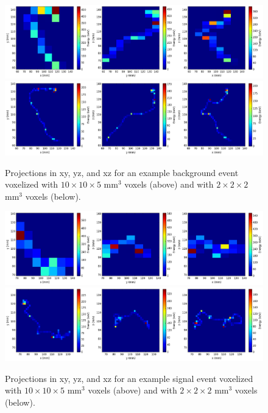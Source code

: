 \documentclass[a4paper,11pt]{article}
\begin{document}
\begin{figure}[!htb]
	\centering
	\includegraphics[scale=0.36]{fig/plt_h2D_dnn_NEXT100_Bi214_bg_v10x10x5_r200x200x200_6_bg.png}
	\includegraphics[scale=0.36]{fig/plt_h2D_dnn_NEXT100_Bi214_bg_v2x2x2_r200x200x200_2_bg.png}
	\caption{\label{fig.exampleProjs10105}Projections in xy, yz, and xz for an example background event voxelized with $10 \times 10 \times 5$ mm$^3$ voxels (above) and with $2 \times 2 \times 2$ mm$^3$ voxels (below).}
\end{figure}

\begin{figure}[!htb]
	\centering
	\includegraphics[scale=0.36]{fig/plt_h2D_dnn_NEXT100_0vbb_si_v10x10x5_r200x200x200_6_si.png}
	\includegraphics[scale=0.36]{fig/plt_h2D_dnn_NEXT100_0vbb_si_v2x2x2_r200x200x200_4_si.png}
	\caption{\label{fig.exampleProjs222}Projections in xy, yz, and xz for an example signal event voxelized with $10 \times 10 \times 5$ mm$^3$ voxels (above) and with $2 \times 2 \times 2$ mm$^3$ voxels (below).}
\end{figure}
\end{document}
